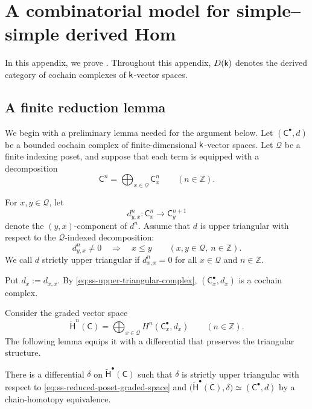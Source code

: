 \appendix
{}

\section{A combinatorial model for simple--simple derived Hom}
\label{app:simple-simple-assembly}

In this appendix, we prove
.
Throughout this appendix, $D(\mathsf{k})$ denotes the derived category of
cochain complexes of $\mathsf{k}$-vector spaces.

\subsection{A finite reduction lemma}
\label{app:ss-finite-reduction}
We begin with a preliminary lemma needed for the argument below. 
Let $(\mathsf C^\bullet,d)$ be a bounded cochain complex of
finite-dimensional $\mathsf{k}$-vector spaces.
Let $\mathcal Q$ be a finite indexing poset, and suppose that each term is equipped with a
decomposition
\[
\mathsf C^n
=
\bigoplus_{x\in\mathcal Q}\mathsf C_x^n 
\qquad
(n\in\mathbb Z).
\]

For $x,y\in\mathcal Q$, let
\[
d_{y,x}^n\colon
\mathsf C_x^n
\longrightarrow
\mathsf C_y^{n+1}
\]
denote the $(y,x)$-component of $d^n$.  Assume that $d$ is upper
triangular with respect to the $\mathcal Q$-indexed decomposition:
\begin{equation}
\label{eq:ss-upper-triangular-complex}
d_{y,x}^n\neq0
\quad\Longrightarrow\quad
x\leq y
\qquad
(x,y\in\mathcal Q,\ n\in\mathbb Z).
\end{equation}
We call $d$ strictly upper triangular if
$d_{x,x}^n=0$ for all $x\in\mathcal Q$ and $n\in\mathbb Z$.

Put $d_x:=d_{x,x}$. 
By \eqref{eq:ss-upper-triangular-complex}, $(\mathsf C_x^\bullet,d_x)$ is a cochain complex.

Consider the graded vector space 
\begin{equation}
\label{eq:ss-reduced-poset-graded-space}
\widetilde{\mathsf H}^n(\mathsf C)
=
\bigoplus_{x\in\mathcal Q}
H^n(\mathsf C_x^\bullet,d_x)
\qquad
(n\in\mathbb Z).
\end{equation}
The following lemma equips it with a differential that preserves
the triangular structure.

\begin{lemma}
\label{lem:ss-upper-triangular-cohomology}
There is a differential $\delta$ on
$\widetilde{\mathsf H}^\bullet(\mathsf C)$ such that $\delta$ is strictly upper
triangular with respect to
\eqref{eq:ss-reduced-poset-graded-space} and
$\bigl(\widetilde{\mathsf H}^\bullet(\mathsf C),\delta\bigr)
\simeq
(\mathsf C^\bullet,d)$ by a chain-homotopy equivalence.
\end{lemma}



